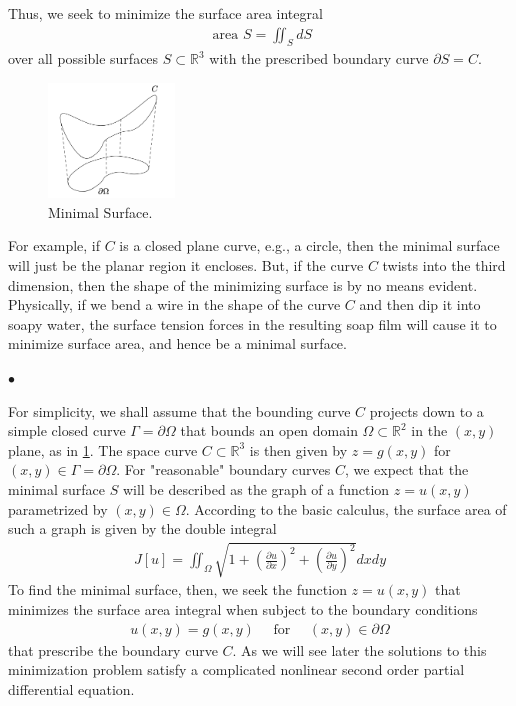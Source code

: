 \documentclass{article}
\begin{document}
Thus, we seek to minimize the surface area integral
\begin{align*}
\text { area } S=\iint_{S} d S
\end{align*}
over all possible surfaces $S \subset \mathbb{R}^{3}$ with the prescribed boundary curve $\partial S=C$. 
\begin{figure}[ht]
    \centering
    \includegraphics[width=0.3\textwidth]{Figs/a3.png}
    \caption{Minimal Surface.}
    \label{fig:Minimal Surface}
\end{figure}
\begin{exma}
For example, if $C$ is a closed plane curve, e.g., a circle, then the minimal surface will just be the planar region it encloses. But, if the curve $C$ twists into the third dimension, then the shape of the minimizing surface is by no means evident. Physically, if we bend a wire in the shape of the curve $C$ and then dip it into soapy water, the surface tension forces in the resulting soap film will cause it to minimize surface area, and hence be a minimal surface.
\end{exma}

$\bullet$  

For simplicity, we shall assume that the bounding curve $C$ projects down to a simple closed curve $\Gamma=\partial \Omega$ that bounds an open domain $\Omega \subset \mathbb{R}^{2}$ in the $(x, y)$ plane, as in \cref{fig:Minimal Surface}. The space curve $C \subset \mathbb{R}^{3}$ is then given by $z=g(x, y)$ for $(x, y) \in \Gamma=\partial \Omega$. For "reasonable" boundary curves $C$, we expect that the minimal surface $S$ will be described as the graph of a function $z=u(x, y)$ parametrized by $(x, y) \in \Omega$. According to the basic calculus, the surface area of such a graph is given by the double integral
\begin{align}
J[u]=\iint_{\Omega} \sqrt{1+\left(\frac{\partial u}{\partial x}\right)^{2}+\left(\frac{\partial u}{\partial y}\right)^{2}} d x d y\label{eq:Ldfds}
\end{align}
To find the minimal surface, then, we seek the function $z=u(x, y)$ that minimizes the surface area integral when subject to the boundary conditions
\begin{align*}
u(x, y)=g(x, y) \quad \text { for } \quad(x, y) \in \partial \Omega
\end{align*}
that prescribe the boundary curve $C$. 
As we will see later the solutions to this minimization problem satisfy a complicated nonlinear second order partial differential equation.
\end{document}
